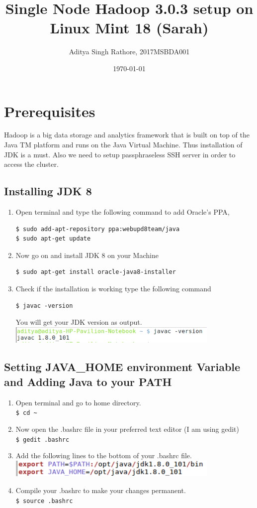 \documentclass[12pt]{article}%
\begin{document}
\title{Single Node Hadoop 3.0.3 setup on Linux Mint 18 (Sarah)}
\author{Aditya Singh Rathore, 2017MSBDA001}
\date{\today}
\maketitle
\section{Prerequisites}
Hadoop is a big data storage and analytics framework that is built on top of the Java TM platform and runs on the Java Virtual Machine. Thus installation of JDK is a must. Also we need to setup passphraseless SSH server in order to access the cluster.

\subsection{Installing JDK 8}
\begin{enumerate}
\item Open terminal and type the following command to add Oracle's PPA,
\begin{lstlisting}
$ sudo add-apt-repository ppa:webupd8team/java
$ sudo apt-get update
\end{lstlisting}
\item Now go on and install JDK 8 on your Machine
\begin{lstlisting}
$ sudo apt-get install oracle-java8-installer
\end{lstlisting}
\item Check if the installation is working type the following command
\begin{lstlisting}
$ javac -version
\end{lstlisting}
You will get your JDK version as output.\\
\includegraphics[width=0.8\textwidth]{javac.png}
\end{enumerate}
\subsection{Setting JAVA\_HOME environment Variable and Adding Java to your PATH}
\begin{enumerate}
\item  Open terminal and go to home directory.\\
\lstinline{$ cd ~}
\item  Now open the .bashrc file in your preferred text editor (I am using gedit)\\
\lstinline{$ gedit .bashrc}
\item Add the following lines to the bottom of your .bashrc file.\\
\includegraphics[width=0.8\textwidth]{img1.png}
\item  Compile your .bashrc to make your changes permanent.\\
\lstinline{$ source .bashrc}
\end{enumerate}
\end{document}
